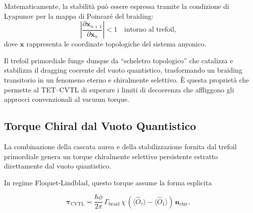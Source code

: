 \documentclass[11pt,a4paper]{article}
\theoremstyle{plain}
\theoremstyle{definition}
\begin{document}
\vspace{0.2cm}


Matematicamente, la stabilità può essere espressa tramite la condizione di Lyapunov per la mappa di Poincaré del braiding:
\begin{equation}
\left| \frac{\partial \mathbf{x}_{n+1}}{\partial \mathbf{x}_n} \right| < 1 \quad \text{intorno al trefoil},
\end{equation}
dove $\mathbf{x}$ rappresenta le coordinate topologiche del sistema anyonico.



\vspace{0.2cm}

Il trefoil primordiale funge dunque da “scheletro topologico” che catalizza e stabilizza il dragging coerente del vuoto quantistico, trasformando un braiding transitorio in un fenomeno eterno e chiralmente selettivo. È questa proprietà che permette al TET--CVTL di superare i limiti di decoerenza che affliggono gli approcci convenzionali al vacuum torque.



\vspace{0.6cm}



\subsection{Torque Chiral dal Vuoto Quantistico}

La combinazione della cascata aurea e della stabilizzazione fornita dal trefoil primordiale genera un torque chiralmente selettivo persistente estratto direttamente dal vuoto quantistico. 

\vspace{0.2cm}

In regime Floquet-Lindblad, questo torque assume la forma esplicita

\vspace{0.2cm}


\begin{tcolorbox}[colback=blue!5!white, colframe=blue!60!black, title=Equazione del Torque Chiral (TET--CVTL), sharp corners]
\begin{equation}
\boldsymbol{\tau}_{\text{CVTL}} = \frac{\hbar \phi}{2\pi} \,\Gamma_{\text{braid}} \,\chi \,\left( \langle \hat{O}_{\tau} \rangle - \langle \hat{O}_{1} \rangle \right) \,\mathbf{n}_{\text{chir}},
\label{eq:tau_cvtl}
\end{equation}
\end{tcolorbox}
\end{document}
